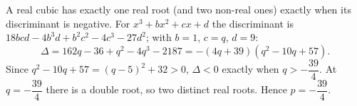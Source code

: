 A real cubic has exactly one real root (and two non-real ones) exactly when its discriminant is negative. For $x^3+bx^2+cx+d$ the discriminant is $18bcd-4b^3d+b^2c^2-4c^3-27d^2$; with $b=1$, $c=q$, $d=9$:
\[\Delta=162q-36+q^2-4q^3-2187=-(4q+39)\left(q^2-10q+57\right).\]
Since $q^2-10q+57=(q-5)^2+32>0$, $\Delta<0$ exactly when $q>-\dfrac{39}{4}$. At $q=-\dfrac{39}{4}$ there is a double root, so two distinct real roots. Hence $p=\boxed{-\dfrac{39}{4}}$.
